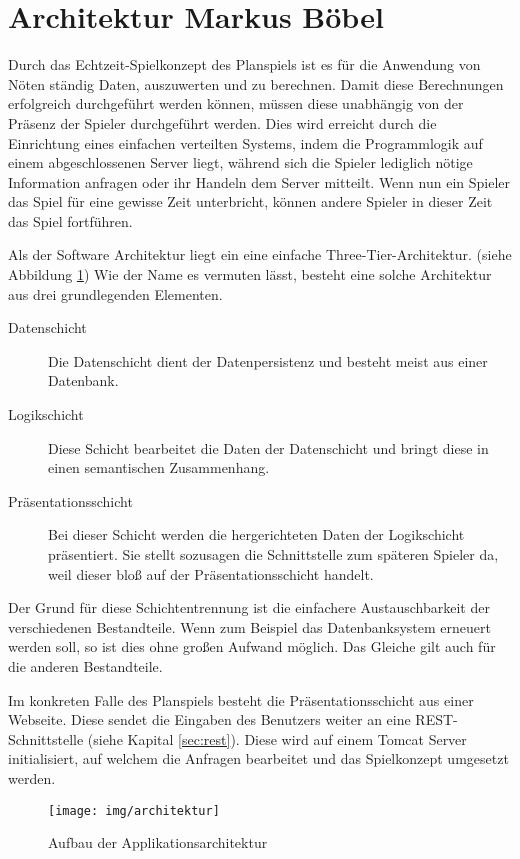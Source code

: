 \section{Architektur \textnormal{\textsf{\small{Markus Böbel}}}}
\label{sec:architektur}
Durch das Echtzeit-Spielkonzept des Planspiels ist es für die Anwendung von Nöten ständig Daten, auszuwerten und zu berechnen. Damit diese Berechnungen erfolgreich durchgeführt werden können, müssen diese unabhängig von der Präsenz der Spieler durchgeführt werden. Dies wird erreicht durch die Einrichtung eines einfachen verteilten Systems, indem die Programmlogik auf einem abgeschlossenen Server liegt, während sich die Spieler lediglich nötige Information anfragen oder ihr Handeln dem Server mitteilt.
Wenn nun ein Spieler das Spiel für eine gewisse Zeit unterbricht, können andere Spieler in dieser Zeit das Spiel fortführen.

Als der Software Architektur liegt ein eine einfache Three-Tier-Architektur. (siehe Abbildung \ref{abb:architektur})
Wie der Name es vermuten lässt, besteht eine solche Architektur aus drei grundlegenden Elementen.

\begin{description}
	\item[Datenschicht] Die Datenschicht dient der Datenpersistenz und besteht meist aus einer Datenbank.
	\item[Logikschicht] Diese Schicht bearbeitet die Daten der Datenschicht und bringt diese in einen semantischen Zusammenhang. 
	\item[Präsentationsschicht] Bei dieser Schicht werden die hergerichteten Daten der Logikschicht präsentiert. Sie stellt sozusagen die Schnittstelle zum späteren Spieler da, weil dieser bloß auf der Präsentationsschicht handelt.
\end{description}
Der Grund für diese Schichtentrennung ist die einfachere Austauschbarkeit der verschiedenen Bestandteile. Wenn zum Beispiel das Datenbanksystem erneuert werden soll, so ist dies ohne großen Aufwand möglich. Das Gleiche gilt auch für die anderen Bestandteile.

Im konkreten Falle des Planspiels besteht die Präsentationsschicht aus einer Webseite. Diese sendet die Eingaben des Benutzers weiter an eine REST-Schnittstelle (siehe Kapital \ref{sec:rest}). Diese wird auf einem Tomcat Server initialisiert, auf welchem die Anfragen bearbeitet und das Spielkonzept umgesetzt werden.


\begin{figure}[h]
	\centering	\texttt{[image: img/architektur]}
	\captionsetup{format=hang}
	\caption{
		\label{abb:architektur}Aufbau der Applikationsarchitektur}
\end{figure}


